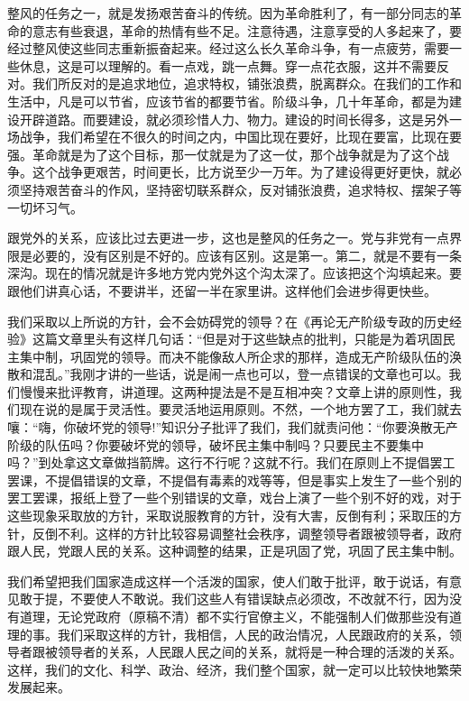 整风的任务之一，就是发扬艰苦奋斗的传统。因为革命胜利了，有一部分同志的革命的意志有些衰退，革命的热情有些不足。注意待遇，注意享受的人多起来了，要经过整风使这些同志重新振奋起来。经过这么长久革命斗争，有一点疲劳，需要一些休息，这是可以理解的。看一点戏，跳一点舞。穿一点花衣服，这并不需要反对。我们所反对的是追求地位，追求特权，铺张浪费，脱离群众。在我们的工作和生活中，凡是可以节省，应该节省的都要节省。阶级斗争，几十年革命，都是为建设开辟道路。而要建设，就必须珍惜人力、物力。建设的时间长得多，这是另外一场战争，我们希望在不很久的时间之内，中国比现在要好，比现在要富，比现在要强。革命就是为了这个目标，那一仗就是为了这一仗，那个战争就是为了这个战争。这个战争更艰苦，时间更长，比方说至少一万年。为了建设得更好更快，就必须坚持艰苦奋斗的作风，坚持密切联系群众，反对铺张浪费，追求特权、摆架子等一切坏习气。

跟党外的关系，应该比过去更进一步，这也是整风的任务之一。党与非党有一点界限是必要的，没有区别是不好的。应该有区别。这是第一。第二，就是不要有一条深沟。现在的情况就是许多地方党内党外这个沟太深了。应该把这个沟填起来。要跟他们讲真心话，不要讲半，还留一半在家里讲。这样他们会进步得更快些。

我们采取以上所说的方针，会不会妨碍党的领导？在《再论无产阶级专政的历史经验》这篇文章里头有这样几句话：“但是对于这些缺点的批判，只能是为着巩固民主集中制，巩固党的领导。而决不能像敌人所企求的那样，造成无产阶级队伍的涣散和混乱。”我刚才讲的一些话，说是闹一点也可以，登一点错误的文章也可以。我们慢慢来批评教育，讲道理。这两种提法是不是互相冲突？文章上讲的原则性，我们现在说的是属于灵活性。要灵活地运用原则。不然，一个地方罢了工，我们就去嚷：“嗨，你破坏党的领导!”知识分子批评了我们，我们就责问他：“你要涣散无产阶级的队伍吗？你要破坏党的领导，破坏民主集中制吗？只要民主不要集中吗？”到处拿这文章做挡箭牌。这行不行呢？这就不行。我们在原则上不提倡罢工罢课，不提倡错误的文章，不提倡有毒素的戏等等，但是事实上发生了一些个别的罢工罢课，报纸上登了一些个别错误的文章，戏台上演了一些个别不好的戏，对于这些现象采取放的方针，采取说服教育的方针，没有大害，反倒有利；采取压的方针，反倒不利。这样的方针比较容易调整社会秩序，调整领导者跟被领导者，政府跟人民，党跟人民的关系。这种调整的结果，正是巩固了党，巩固了民主集中制。

我们希望把我们国家造成这样一个活泼的国家，使人们敢于批评，敢于说话，有意见敢于提，不要使人不敢说。我们这些人有错误缺点必须改，不改就不行，因为没有道理，无论党政府（原稿不清）都不实行官僚主义，不能强制人们做那些没有道理的事。我们采取这样的方针，我相信，人民的政治情况，人民跟政府的关系，领导者跟被领导者的关系，人民跟人民之间的关系，就将是一种合理的活泼的关系。这样，我们的文化、科学、政治、经济，我们整个国家，就一定可以比较快地繁荣发展起来。


